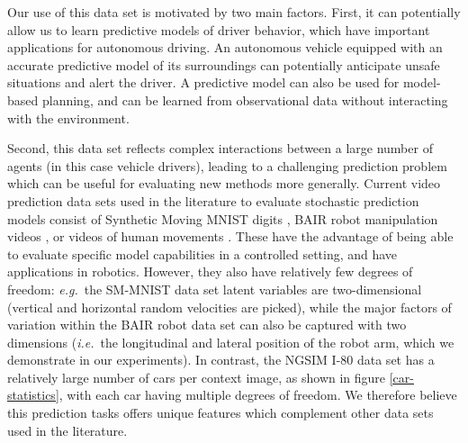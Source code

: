 \documentclass{article}
\begin{document}
Our use of this data set is motivated by two main factors.
First, it can potentially allow us to learn predictive models of driver behavior, which have important applications for autonomous driving.
An autonomous vehicle equipped with an accurate predictive model of its surroundings can potentially anticipate unsafe situations and alert the driver.
A predictive model can also be used for model-based planning, and can be learned from observational data without interacting with the environment.

Second, this data set reflects complex interactions between a large number of agents (in this case vehicle drivers), leading to a challenging prediction problem which can be useful for evaluating new methods more generally.
Current video prediction data sets used in the literature to evaluate stochastic prediction models consist of Synthetic Moving MNIST digits \citep{Denton2018}, BAIR robot manipulation videos \citep{Ebert17}, or videos of human movements \citep{Human}.
These have the advantage of being able to evaluate specific model capabilities in a controlled setting, and have applications in robotics.
However, they also have relatively few degrees of freedom: \emph{e.g.}\ the SM-MNIST data set latent variables are two-dimensional (vertical and horizontal random velocities are picked), while the major factors of variation within the BAIR robot data set can also be captured with two dimensions (\emph{i.e.}\ the longitudinal and lateral position of the robot arm, which we demonstrate in our experiments).
In contrast, the NGSIM I-80 data set has a relatively large number of cars per context image, as shown in figure \ref{car-statistics}, with each car having multiple degrees of freedom.
We therefore believe this prediction tasks offers unique features which complement other data sets used in the literature.
\end{document}
